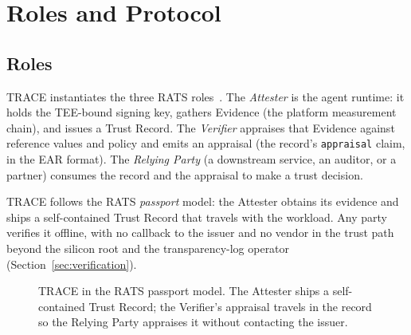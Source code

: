 \section{Roles and Protocol}
\label{sec:protocol}

\subsection{Roles}

TRACE instantiates the three RATS roles~\citep{rats2021}. The \emph{Attester} is the
agent runtime: it holds the TEE-bound signing key, gathers Evidence (the platform
measurement chain), and issues a Trust Record. The \emph{Verifier} appraises that
Evidence against reference values and policy and emits an appraisal (the record's
\texttt{appraisal} claim, in the EAR format). The \emph{Relying Party} (a
downstream service, an auditor, or a partner) consumes the record and the
appraisal to make a trust decision.

TRACE follows the RATS \emph{passport} model: the Attester obtains its evidence and
ships a self-contained Trust Record that travels with the workload. Any party
verifies it offline, with no callback to the issuer and no vendor in the trust path
beyond the silicon root and the transparency-log operator
(Section~\ref{sec:verification}).

\begin{figure}[h]
\centering
{}
\caption{TRACE in the RATS passport model. The Attester ships a self-contained
Trust Record; the Verifier's appraisal travels in the record so the Relying Party
appraises it without contacting the issuer.}
\label{fig:roles}
\end{figure}

